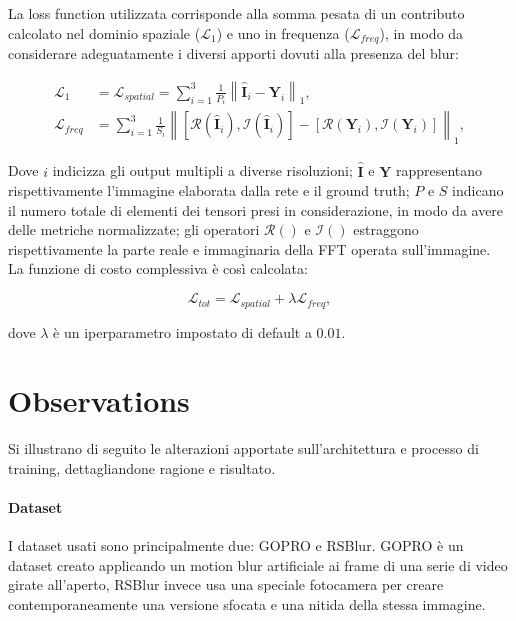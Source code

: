 \documentclass[a4paper,10pt,twocolumn]{article}
\begin{document}
La loss function utilizzata corrisponde alla somma pesata di un contributo calcolato nel dominio spaziale (\(\mathcal{L}_1\)) e uno in frequenza (\(\mathcal{L}_{freq}\)), in modo da considerare adeguatamente i diversi apporti dovuti alla presenza del blur:

\begin{align}
  \mathcal{L}_1 &= \mathcal{L}_{spatial} = \sum_{i=1}^{3}\frac{1}{P_i} \left\lVert \hat{\mathbf{I}}_i - \mathbf{Y}_i \right\rVert _1, \\
  \mathcal{L}_{freq} &= \sum_{i=1}^{3}\frac{1}{S_i} \left\lVert [\mathcal{R}(\hat{\mathbf{I}}_i), \mathcal{I}(\hat{\mathbf{I}}_i)] - [\mathcal{R}(\mathbf{Y}_i), \mathcal{I}(\mathbf{Y}_i)] \right\rVert _1,
\end{align}

Dove \(i\) indicizza gli output multipli a diverse risoluzioni; \(\hat{\mathbf{I}}\) e \(\mathbf{Y}\) rappresentano rispettivamente l'immagine elaborata dalla rete e il ground truth;
\(P\) e \(S\) indicano il numero totale di elementi dei tensori presi in considerazione, in modo da avere delle metriche normalizzate;
gli operatori \(\mathcal{R}()\) e \(\mathcal{I}()\) estraggono rispettivamente la parte reale e immaginaria della FFT operata sull'immagine.\\
La funzione di costo complessiva è così calcolata:

\begin{equation}
  \mathcal{L}_{tot} = \mathcal{L}_{spatial} + \lambda\mathcal{L}_{freq},
  \label{eq:total_loss_function}
\end{equation}

dove \(\lambda\) è un iperparametro impostato di default a \(0.01\).

\section{Observations}

Si illustrano di seguito le alterazioni apportate sull'architettura e processo di training, dettagliandone ragione e risultato.

\paragraph{Dataset}
I dataset usati sono principalmente due: GOPRO e RSBlur.
GOPRO è un dataset creato applicando un motion blur artificiale ai frame di una serie di video girate all'aperto, RSBlur invece usa una speciale fotocamera per creare contemporaneamente
una versione sfocata e una nitida della stessa immagine.
\end{document}
